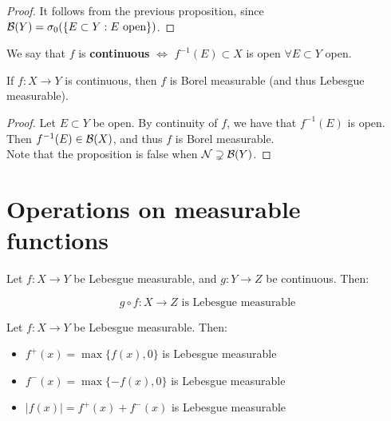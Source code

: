 \begin{proof}
    It follows from the previous proposition, since $\mathcal{B}(Y) = \sigma_0(\{E \subset Y: E \text{ open}\})$.
\end{proof}

\begin{fdefinition}
    We say that $f$ is \textbf{continuous} $\iff$ $f^{-1}(E) \subset X$ is open $\forall E \subset Y$ open.
\end{fdefinition}

\begin{fproposition}
    If $f: X \to Y$ is continuous, then $f$ is Borel measurable (and thus Lebesgue measurable).
\end{fproposition}

\begin{proof}
    Let $E \subset Y$ be open. By continuity of $f$, we have that $f^{-1}(E)$ is open.
    Then $f^{-1}(E) \in \mathcal{B}(X)$, and thus $f$ is Borel measurable.\\

    Note that the proposition is false when $\mathcal{N} \supsetneq \mathcal{B}(Y)$.
\end{proof}

\section{Operations on measurable functions}

\begin{fproposition}
    Let $f: X \to Y$ be Lebesgue measurable, and $g: Y \to Z$ be continuous. Then:

    $$g \circ f: X \to Z \text{ is Lebesgue measurable}$$
\end{fproposition}

\begin{fcorollary}
    Let $f: X \to Y$ be Lebesgue measurable. Then:
    \vspace{1em}
    \begin{itemize}
        \item $f^+(x) = \max\{f(x), 0\}$ is Lebesgue measurable
        \vspace{1em}
        \item $f^-(x) = \max\{-f(x), 0\}$ is Lebesgue measurable
        \vspace{1em}
        \item $|f(x)| = f^+(x) + f^-(x)$ is Lebesgue measurable
    \end{itemize}

\end{fcorollary}

